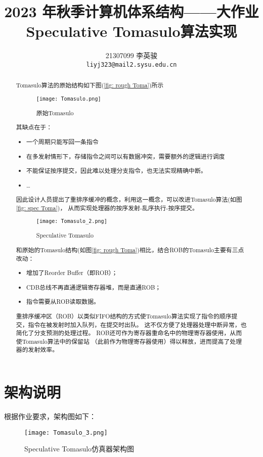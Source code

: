 \documentclass{article}
\title{2023 年秋季计算机体系结构——大作业\\Speculative Tomasulo算法实现}
\author{%
    21307099 李英骏\\
    \texttt{liyj323@mail2.sysu.edu.cn} \\
}
\begin{document}
\maketitle

\begin{abstract}
    Tomasulo算法的原始结构如下图(\ref{fig: rough Toma})所示
    \begin{figure}[H]
        \centering
        \texttt{[image: Tomasulo.png]}
        \caption{原始Tomasulo}
        \label{fig: rough Toma}
    \end{figure}
    其缺点在于：
    \begin{itemize}
        \item 一个周期只能写回一条指令
        \item 在多发射情形下，存储指令之间可以有数据冲突，需要额外的逻辑进行调度
        \item 不能保证按序提交，因此难以处理分支指令，也无法实现精确中断。
        \item \dots
    \end{itemize}
    因此设计人员提出了重排序缓冲的概念，利用这一概念，可以改进Tomasulo算法(如图\ref{fig: spec Toma})，
    从而实现处理器的按序发射-乱序执行-按序提交。
    \begin{figure}[H]
        \centering
        \texttt{[image: Tomasulo\_2.png]}
        \caption{Speculative Tomasulo}
        \label{fig: spec Toma}
    \end{figure}
    和原始的Tomasulo结构(如图\ref{fig: rough Toma})相比，结合ROB的Tomasulo主要有三点改动：
    \begin{itemize}
        \item 增加了Reorder Buffer（即ROB）；
        \item CDB总线不再直通逻辑寄存器堆，而是直通ROB；
        \item 指令需要从ROB读取数据。
    \end{itemize}

    重排序缓冲区（ROB）以类似FIFO结构的方式使Tomasulo算法实现了指令的顺序提交，指令在被发射时加入队列，在提交时出队。
    这不仅方便了处理器处理中断异常，也简化了分支预测的处理过程。
    ROB还可作为寄存器重命名中的物理寄存器使用，从而使Tomasulo算法中的保留站
    （此前作为物理寄存器使用）得以释放，进而提高了处理器的发射效率。

\end{abstract}

\newpage
\section{架构说明}
根据作业要求，架构图如下：
\begin{figure}[H]
    \centering
    \texttt{[image: Tomasulo\_3.png]}
    \caption{Speculative Tomasulo仿真器架构图}
    \label{fig: Real Toma}
\end{figure}
\end{document}
